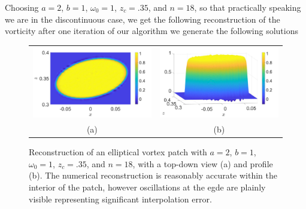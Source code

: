 \documentclass[a4paper,11pt]{article}
\begin{document}
Choosing $a=2$, $b=1$, $\omega_{0}=1$, $z_{c}=.35$, and $n=18$, so that practically speaking we are in the discontinuous case, we get the following reconstruction of the vorticity after one iteration of our algorithm we generate the following solutions
\begin{figure}[!h]
\begin{tabular}{cc}
\includegraphics[width=.5\textwidth]{patch_reconstruction_n_18_w0_1} & \includegraphics[width=.5\textwidth]{patch_reconstruction_n_18_w0_1_profile}\\
(a) & (b)
\end{tabular}
\caption{Reconstruction of an elliptical vortex patch with $a=2$, $b=1$, $\omega_{0}=1$, $z_{c}=.35$, and $n=18$, with a top-down view (a) and profile (b).  The numerical reconstruction is reasonably accurate within the interior of the patch, however oscillations at the egde are plainly visible representing significant interpolation error. }
\end{figure}


\end{document}

